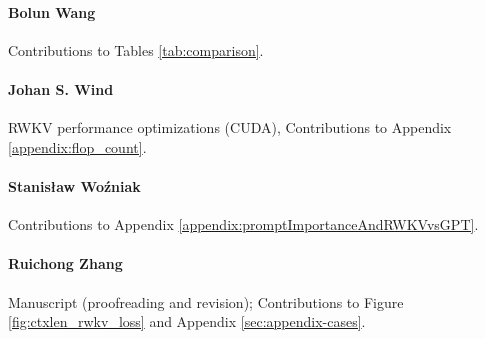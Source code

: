 \documentclass[11pt]{article}
\begin{document}
\paragraph{Bolun Wang} Contributions to Tables \ref{tab:comparison}.

\paragraph{Johan S. Wind} RWKV performance optimizations (CUDA), Contributions to Appendix \ref{appendix:flop_count}. 


\paragraph{Stanis\l{}aw Wo\'{z}niak} Contributions to Appendix \ref{appendix:promptImportanceAndRWKVvsGPT}.

\paragraph{Ruichong Zhang} Manuscript (proofreading and revision); Contributions to Figure \ref{fig:ctxlen_rwkv_loss} and Appendix \ref{sec:appendix-cases}.

\end{document}
